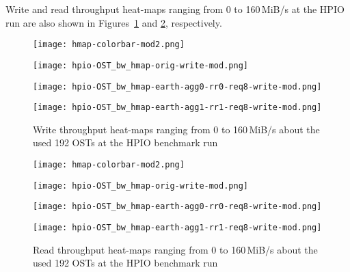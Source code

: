 \documentclass{jhps}
\begin{document}
Write and read throughput heat-maps ranging from 0 to 160\,MiB/s
at the HPIO run are also shown in
Figures~\ref{fig:HPIO_OST_BW_HMAP_WR}
and \ref{fig:HPIO_OST_BW_HMAP_RD}, respectively.
%
\begin{figure}[htb]
\begin{minipage}[t]{0.06\textwidth}
 \texttt{[image: hmap-colorbar-mod2.png]}
\end{minipage}
%
\noindent
\begin{minipage}[t]{0.29\textwidth}
 \centering
 \texttt{[image: hpio-OST\_bw\_hmap-orig-write-mod.png]}
\end{minipage}
%
\noindent
\begin{minipage}[t]{0.29\textwidth}
 \centering
 \texttt{[image: hpio-OST\_bw\_hmap-earth-agg0-rr0-req8-write-mod.png]}
\end{minipage}
%
\noindent
\begin{minipage}[t]{0.31\textwidth}
 \centering
 \texttt{[image: hpio-OST\_bw\_hmap-earth-agg1-rr1-req8-write-mod.png]}
\end{minipage}
%
\caption{Write throughput heat-maps ranging from 0 to 160\,MiB/s about
the used 192 OSTs at the HPIO benchmark run}
\label{fig:HPIO_OST_BW_HMAP_WR}
\end{figure}
%
\begin{figure}[tb]
\begin{minipage}[t]{0.06\textwidth}
 \texttt{[image: hmap-colorbar-mod2.png]}
\end{minipage}
%
\noindent
\begin{minipage}[t]{0.29\textwidth}
 \centering
 \texttt{[image: hpio-OST\_bw\_hmap-orig-write-mod.png]}
\end{minipage}
%
\noindent
\begin{minipage}[t]{0.29\textwidth}
 \centering
 \texttt{[image: hpio-OST\_bw\_hmap-earth-agg0-rr0-req8-write-mod.png]}
\end{minipage}
%
\noindent
\begin{minipage}[t]{0.31\textwidth}
 \centering
 \texttt{[image: hpio-OST\_bw\_hmap-earth-agg1-rr1-req8-write-mod.png]}
\end{minipage}
%
\caption{Read throughput heat-maps ranging from 0 to 160\,MiB/s about
the used 192 OSTs at the HPIO benchmark run}
\label{fig:HPIO_OST_BW_HMAP_RD}
\end{figure}
\end{document}
